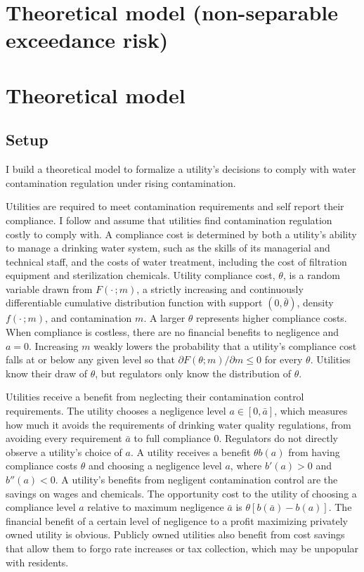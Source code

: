 \documentclass{article}
\begin{document}
	
	\section{Theoretical model (non-separable exceedance risk)}
	
	\section{Theoretical model}
	
	\subsection{Setup}
	
	I build a theoretical model to formalize a utility's decisions to comply with water contamination regulation under rising contamination.
    
	Utilities are required to meet contamination requirements and self report their compliance. I follow \textcite{mookherjee1994marginal} and assume that utilities find contamination regulation costly to comply with. A compliance cost is determined by both a utility's ability to manage a drinking water system, such as the skills of its managerial and technical staff, and the costs of water treatment, including the cost of filtration equipment and sterilization chemicals. Utility compliance cost, $\theta$, is a random variable drawn from $F(\cdot\,;m)$, a strictly increasing and continuously differentiable cumulative distribution function with support $(0, \bar{\theta})$, density $f(\cdot\,;m)$, and contamination $m$. A larger $\theta$ represents higher compliance costs. When compliance is costless, there are no financial benefits to negligence and $a=0$. Increasing $m$ weakly lowers the probability that a utility's compliance cost falls at or below any given level so that $\partial F(\theta;m)/\partial m \le 0$ for every $\theta$. Utilities know their draw of $\theta$, but regulators only know the distribution of $\theta$. 

    Utilities receive a benefit from neglecting their contamination control requirements. The utility chooses a negligence level $a \in [0, \bar{a}]$, which measures how much it avoids the requirements of drinking water quality regulations, from avoiding every requirement $\bar{a}$ to full compliance 0. Regulators do not directly observe a utility's choice of $a$. A utility receives a benefit $\theta b(a)$ from having compliance costs $\theta$ and choosing a negligence level $a$, where $b'(a)>0$ and $b''(a)<0$. A utility's benefits from negligent contamination control are the savings on wages and chemicals. The opportunity cost to the utility of choosing a compliance level $a$ relative to maximum negligence $\bar{a}$ is $\theta[b(\bar{a})-b(a)]$. The financial benefit of a certain level of negligence to a profit maximizing privately owned utility is obvious. Publicly owned utilities also benefit from cost savings that allow them to forgo rate increases or tax collection, which may be unpopular with residents.
	
\end{document}
